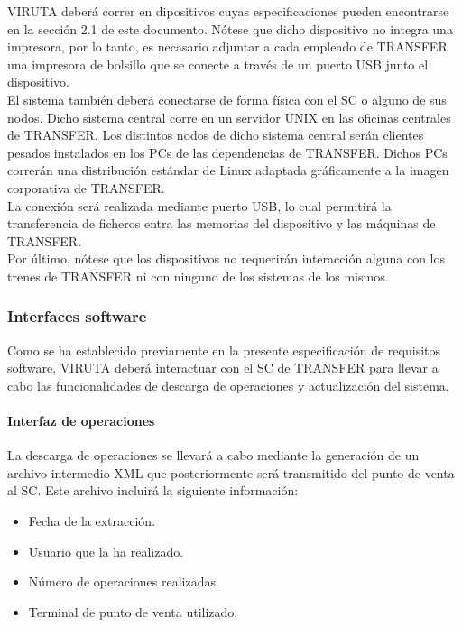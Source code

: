  VIRUTA deberá correr en dipositivos cuyas especificaciones  pueden encontrarse en la sección 2.1 de este documento. Nótese que dicho dispositivo no integra una impresora, por lo tanto, es necasario adjuntar a cada empleado de TRANSFER una impresora de bolsillo que se conecte a través de un puerto USB junto el dispositivo.\\ 

El sistema también deberá conectarse de forma física con el SC o alguno de sus nodos. Dicho sistema central corre en un servidor UNIX en las oficinas centrales de TRANSFER. Los distintos nodos de dicho sistema central serán clientes pesados instalados en los PCs de las dependencias de TRANSFER. Dichos PCs correrán una distribución estándar de Linux adaptada gráficamente a la imagen corporativa de TRANSFER.\\

La conexión será realizada mediante puerto USB, lo cual permitirá la transferencia de ficheros entra las memorias del dispositivo y las máquinas de TRANSFER.\\

Por último, nótese que los dispositivos no requerirán interacción alguna con los trenes de TRANSFER ni con ninguno de los sistemas de los mismos.

\subsubsection{Interfaces software}

Como se ha establecido previamente en la presente especificación de requisitos software, VIRUTA deberá interactuar con el SC de TRANSFER para llevar a cabo las funcionalidades de descarga de operaciones y actualización del sistema.

\paragraph{Interfaz de operaciones}

La descarga de operaciones se llevará a cabo mediante la generación de un archivo intermedio XML que posteriormente será transmitido del punto de venta al SC. Este archivo incluirá la siguiente información:

\begin{itemize}
\item Fecha de la extracción.
\item Usuario que la ha realizado.
\item Número de operaciones realizadas.
\item Terminal de punto de venta utilizado.
\end{itemize}

